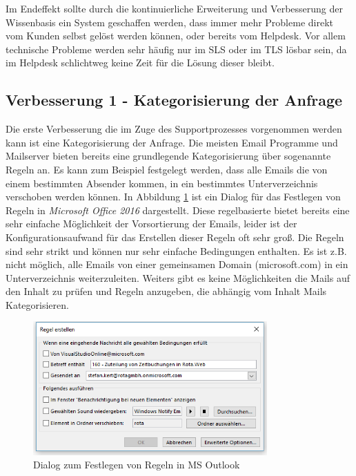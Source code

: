 Im Endeffekt sollte durch die kontinuierliche Erweiterung und Verbesserung der Wissenbasis ein System geschaffen werden, dass immer mehr Probleme direkt vom Kunden selbst gelöst werden können, oder bereits vom Helpdesk. Vor allem technische Probleme werden sehr häufig nur im SLS oder im TLS lösbar sein, da im Helpdesk schlichtweg keine Zeit für die Lösung dieser bleibt. 

\subsection{Verbesserung 1 - Kategorisierung der Anfrage}
Die erste Verbesserung die im Zuge des Supportprozesses vorgenommen werden kann ist eine Kategorisierung der Anfrage. Die meisten Email Programme und Mailserver bieten bereits eine grundlegende Kategorisierung über sogenannte Regeln an. Es kann zum Beispiel festgelegt werden, dass alle Emails die von einem bestimmten Absender kommen, in ein bestimmtes Unterverzeichnis verschoben werden können. In Abbildung \ref{fig:outlook-rules} ist ein Dialog für das Festlegen von Regeln in \textit{Microsoft Office 2016} dargestellt. Diese regelbasierte bietet bereits eine sehr einfache Möglichkeit der Vorsortierung der Emails, leider ist der Konfigurationsaufwand für das Erstellen dieser Regeln oft sehr groß. Die Regeln sind sehr strikt und können nur sehr einfache Bedingungen enthalten. Es ist z.B. nicht möglich, alle Emails von einer gemeinsamen Domain (microsoft.com) in ein Unterverzeichnis weiterzuleiten. Weiters gibt es keine Möglichkeiten die Mails auf den Inhalt zu prüfen und Regeln anzugeben, die abhängig vom Inhalt Mails Kategorisieren.

\begin{figure}[ht]
	\centering
		\includegraphics[width=0.80\textwidth]{images/outlook_rules.PNG}
	\caption{Dialog zum Festlegen von Regeln in MS Outlook}
	\label{fig:outlook-rules}
\end{figure}

